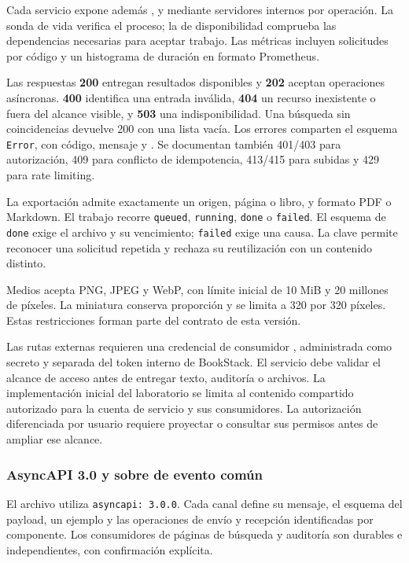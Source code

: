 Cada servicio expone además ,  y
 mediante servidores internos por operación. La sonda de
vida verifica el proceso; la de disponibilidad comprueba las dependencias
necesarias para aceptar trabajo. Las métricas incluyen solicitudes por
código y un histograma de duración en formato Prometheus.

Las respuestas \textbf{200} entregan resultados disponibles y
\textbf{202} aceptan operaciones asíncronas. \textbf{400} identifica una
entrada inválida, \textbf{404} un recurso inexistente o fuera del alcance
visible, y \textbf{503} una indisponibilidad. Una búsqueda sin coincidencias
devuelve 200 con una lista vacía. Los errores comparten el esquema
\texttt{Error}, con código, mensaje y . Se documentan
también 401/403 para autorización, 409 para conflicto de idempotencia,
413/415 para subidas y 429 para rate limiting.

La exportación admite exactamente un origen, página o libro, y formato PDF
o Markdown. El trabajo recorre \texttt{queued}, \texttt{running},
\texttt{done} o \texttt{failed}. El esquema de \texttt{done} exige el archivo
y su vencimiento; \texttt{failed} exige una causa. La clave
 permite reconocer una solicitud repetida y rechaza
su reutilización con un contenido distinto.

Medios acepta PNG, JPEG y WebP, con límite inicial de 10 MiB y 20 millones
de píxeles. La miniatura conserva proporción y se limita a 320 por 320
píxeles. Estas restricciones forman parte del contrato de esta versión.

Las rutas externas requieren una credencial de consumidor
, administrada como secreto y separada del token interno
de BookStack. El servicio debe validar el alcance de acceso antes de
entregar texto, auditoría o archivos. La implementación inicial del
laboratorio se limita al contenido compartido autorizado para la cuenta
de servicio y sus consumidores. La autorización diferenciada por usuario
requiere proyectar o consultar sus permisos antes de ampliar ese alcance.

\subsubsection{AsyncAPI 3.0 y sobre de evento común}
El archivo  utiliza
\texttt{asyncapi: 3.0.0}. Cada canal define su mensaje, el esquema del
payload, un ejemplo y las operaciones de envío y recepción identificadas
por componente. Los consumidores de páginas de búsqueda y auditoría son
durables e independientes, con confirmación explícita.

